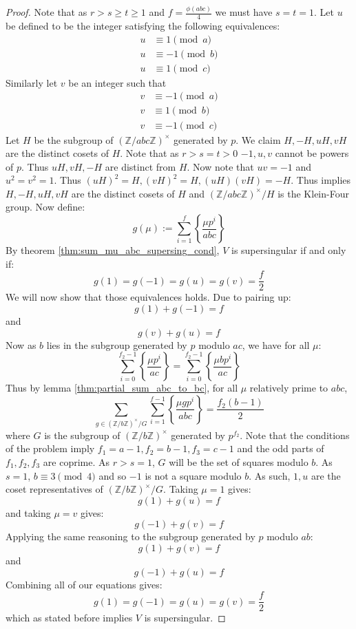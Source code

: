 \documentclass{article}
\newcommand{\Z}{\mathbb{Z}}
\newcommand{\frp}[2]{\left\{\frac{#1}{#2}\right\}}
\theoremstyle{definition}
\theoremstyle{definition}
\theoremstyle{remark}
\begin{document}
\begin{proof}
Note that as $r > s \ge t \ge 1$ and $f = \frac{\phi(abc)}{4}$ we must have $s = t = 1$. Let $u$ be defined to be the integer satisfying the following equivalences:
\begin{align*}
u &\equiv 1 \pmod{a} \\
u &\equiv -1 \pmod{b} \\
u &\equiv 1 \pmod{c}
\end{align*}
Similarly let $v$ be an integer such that 
\begin{align*}
v &\equiv -1 \pmod{a} \\
v &\equiv 1 \pmod{b} \\
v &\equiv -1 \pmod{c}
\end{align*}
Let $H$ be the subgroup of $(\Z/abc\Z)^{\times}$ generated by $p$. We claim $H, -H, uH, vH$ are the distinct cosets of $H$. Note that as $r > s=t > 0$ $-1, u, v$ cannot be powers of $p$. Thus $uH, vH, -H$ are distinct from $H$. Now note that $uv = -1$ and $u^2 = v^2 = 1$. Thus $(uH)^2 = H, (vH)^2 = H, (uH)(vH) = -H$. Thus implies $H, -H, uH, vH$ are the distinct cosets of $H$ and $(\Z/abc\Z)^{\times}/H$ is the Klein-Four group. Now define:
\[g(\mu) := \sum_{i = 1}^f \frp{\mu p^i}{abc}\]
By theorem \ref{thm:sum_mu_abc_supersing_cond}, $V$ is supersingular if and only if:
\[g(1) = g(-1) = g(u) = g(v) = \frac{f}{2}\]
We will now show that those equivalences holds. Due to pairing up:
\[g(1) + g(-1) = f\]
and
\[g(v) + g(u) = f\]
Now as $b$ lies in the subgroup generated by $p$ modulo $ac$, we have for all $\mu$:
\[\sum_{i = 0}^{f_2 - 1} \frp{\mu p^i}{ac} = \sum_{i = 0}^{f_2 - 1} \frp{\mu bp^i}{ac}\]
Thus by lemma \ref{thm:partial_sum_abc_to_bc}, for all $\mu$ relatively prime to $abc$,
\[ \sum_{g \in (\Z/b\Z)^{\times}/G} \sum_{i=1}^{f-1} \frp{\mu g p^i}{abc}= \frac{f_2(b-1)}{2}\]
where $G$ is the subgroup of $(\Z/b\Z)^{\times}$ generated by $p^{f_2}$. Note that the conditions of the problem imply $f_1 = a - 1, f_2 = b - 1, f_3 = c - 1$ and the odd parts of $f_1, f_2, f_3$ are coprime. As $r > s=1$, $G$ will be the set of squares modulo $b$. As $s = 1$, $b \equiv 3 \pmod{4}$ and so $-1$ is not a square modulo $b$. As such, $1, u$ are the coset representatives of $(\Z/b\Z)^{\times}/G$. Taking $\mu = 1$ gives:
\[g(1) + g(u) = f\]
and taking $\mu = v$ gives:
\[g(-1) + g(v) = f\]
Applying the same reasoning to the subgroup generated by $p$ modulo $ab$:
\[g(1) + g(v) = f\]
and
\[g(-1) + g(u) = f\]
Combining all of our equations gives:
\[g(1) = g(-1) = g(u) = g(v) = \frac{f}{2}\]
which as stated before implies $V$ is supersingular.
\end{proof}
\end{document}
